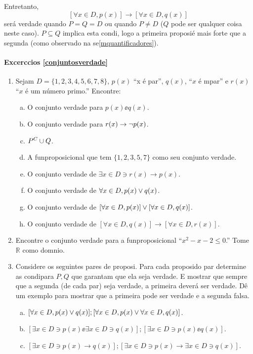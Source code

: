 Entretanto,
\[
[\forall x\in D, p(x)]\to[\forall x\in D, q(x)]
\]
ser\'a verdade quando $P=Q=D$ ou quando $P\neq D$ ($Q$ pode ser qualquer coisa neste caso). $P\subseteq Q$ implica esta condi\caoi, logo a primeira proposi\cao \'e mais forte que a segunda (como observado na se\cao \ref{mquantificadores}).

\paragraph{Excerc\ih cios \ref{conjuntosverdade}}

\begin{enumerate}[{\bf 1.}]
\item Sejam $D=\{1,2,3,4,5,6,7,8\}$, $p(x)$ ``x \'e par'', $q(x)$, ``$x$ \'e \ih mpar'' e $r(x)$ ``$x$ \'e um n\'umero primo.'' Encontre:
\begin{enumerate}[a)]
\item O conjunto verdade para $p(x)\ee q(x)$.
\item O conjunto verdade para $r(x)\to\lnot p(x)$.
\item $P^C\cup Q$.
\item A fun\cao proposicional que tem $\{1,2,3,5,7\}$ como seu conjunto verdade.
\item O conjunto verdade de $\exists x \in D \ni r(x)\to p(x)$.
\item O conjunto verdade de $\forall x\in D, p(x)\vee q(x)$.
\item O conjunto verdade de $[\forall x\in D, p(x)]\vee[\forall x\in D, q(x)]$.
\item O conjunto verdade de $[\forall x\in D, q(x)]\to[\forall x\in D, r(x)]$.
\end{enumerate}

\item Encontre o conjunto verdade para a fun\cao proposicional ``$x^2-x-2\leq 0$.'' Tome $\mathbb{R}$ como dom\ih nio.

\item Considere os seguintes pares de proposi\cois. Para cada proposi\cao do par determine as condi\coes para $P,Q$ que garantam que ela seja verdade. E mostrar que sempre que a segunda (de cada par) seja verdade, a primeira dever\'a ser verdade. D\^e um exemplo para mostrar que a primeira pode ser verdade e a segunda falsa.
\begin{enumerate}[a)]
\item $[\forall x\in D, p(x)\vee q(x)]; [\forall x\in D, p(x) \vee \forall x \in D, q(x)]$.
\item $[\exists x\in D\ni p(x)\ee \exists x\in D\ni q(x)];[\exists x\in D\ni p(x)\ee q(x)]$.
\item $[\exists x\in D\ni p(x)\to q(x)];[\exists x\in D\ni p(x) \to \exists x\in D\ni q(x)]$.
\end{enumerate}


\end{enumerate}
